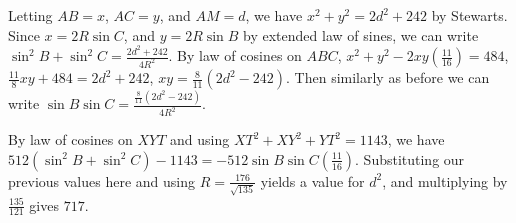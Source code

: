 \begin{enumerate}
 Letting $AB = x$, $AC = y$, and $AM = d$, we have $x^2 + y^2 = 2d^2 + 242$ by Stewarts. Since $x = 2R\sin{C}$, and $y = 2R\sin{B}$ by extended law of sines, we can write $\sin^2{B} + \sin^2{C} = \frac{2d^2 + 242}{4R^2}$. By law of cosines on $ABC$, $x^2 + y^2 - 2xy(\frac{11}{16}) = 484$, $\frac{11}{8} xy + 484 = 2d^2 + 242$, $xy = \frac{8}{11} (2d^2 - 242)$. Then similarly as before we can write $\sin{B}\sin{C} = \frac{\frac{8}{11} (2d^2 - 242)}{4R^2}$.

 By law of cosines on $XYT$ and using $XT^2 + XY^2 + YT^2 = 1143$, we have $512(\sin^2{B} + \sin^2{C}) - 1143 = -512\sin{B}\sin{C}(\frac{11}{16})$. Substituting our previous values here and using $R = \frac{176}{\sqrt{135}}$ yields a value for $d^2$, and multiplying by $\frac{135}{121}$ gives $\boxed{717}$.

 


\end{enumerate}